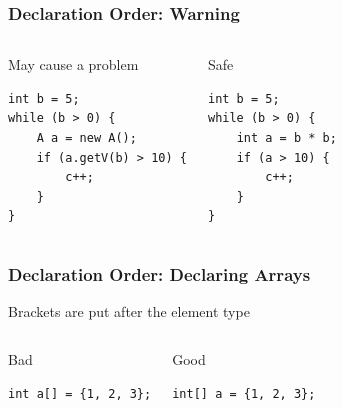 \documentclass[screen]{beamer}
\newcommand{\badgood}[2]{%
	\begin{columns}%
		\column{.5\textwidth}%
		\begin{alertblock}{Bad}%
			#1%
		\end{alertblock}%
		\column{.5\textwidth}%
		\begin{exampleblock}{Good}%
			#2%
		\end{exampleblock}%
	\end{columns}%
}%
\begin{document}
\begin{frame}[fragile]
\frametitle{Declaration Order: Warning}%
\begin{columns}
\begin{alertblock}{May cause a problem}
\begin{lstlisting}
int b = 5;
while (b > 0) {
    A a = new A();
    if (a.getV(b) > 10) {
        c++;
    }
}
\end{lstlisting}
\end{alertblock}
\begin{exampleblock}{Safe}
\begin{lstlisting}
int b = 5;
while (b > 0) {
    int a = b * b;
    if (a > 10) {
        c++;
    }
}
\end{lstlisting}
\end{exampleblock}
\end{columns}
\end{frame}

\begin{frame}[fragile]
\frametitle{Declaration Order: Declaring Arrays}%
%
\begin{block}{Brackets are put after the \alert{element type}}
	\badgood{
		\lstinline!int a[] = {1, 2, 3};!\\
	}{
		\lstinline!int[] a = {1, 2, 3};!\\
	}
\end{block}
\end{frame}

\end{document}
